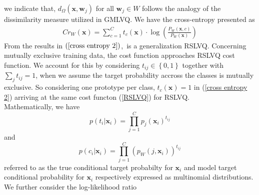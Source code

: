 we indicate that,\hspace{2pt} $d_{\Omega}\left( \mathbf{x},\mathbf{w}_{j}\right)$\hspace{2pt} for all\hspace{2pt} $\mathbf{w}_{j}\in W$\hspace{2pt} follows the analogy of the dissimilarity measure utilized in GMLVQ.
We have the cross-entropy presented as
\begin{align}\label{cross entropy 2}
	Cr_{W}\left( \mathbf{x}\right) =\sum_{c=1}^{C}t_{c}\left( \mathbf{x}\right) \cdot\log\left( \frac{P_{W}\left( \mathbf{x},c\right) }{P_{W}\left( \mathbf{x}\right) } \right) 
\end{align}
From the results in $\left(\ref{cross entropy 2}\right) $,\ is a generalization RSLVQ\cite{villmann2018probabilistic}.
Concerning mutually exclusive training data, the cost function approaches RSLVQ cost function\cite{villmann2018probabilistic}. We account for this by considering\hspace{2pt} $t_{ij}\in\left\lbrace 0,1\right\rbrace  $\hspace{2pt} together with \hspace{2pt}$\sum_{j}t_{ij}=1$, \hspace{2pt}when we assume the target probability accross the classes is mutually exclusive. So considering one prototype per class,\hspace{2pt} $t_{c}\left( \mathbf{x}\right) = 1$\hspace{2pt} in (\ref{cross entropy 2}) arriving at the same cost functon (\ref{RSLVQ}) for RSLVQ.\\ Mathematically, we have
\begin{equation*}
	p\left( t_{i}| \mathbf{x}_{i} \right) = \prod_{j=1}^{C}p_{j}\left( \mathbf{x}_{i}\right) ^{t_{ij}}
\end{equation*}
and 
\begin{equation*}
	p\left( c_{i}| \mathbf{x}_{i} \right) = \prod_{j=1}^{C}\left( p_{W}\left( j,\mathbf{x}_{i}\right)\right) ^{t_{ij}}
\end{equation*}
referred to as the true conditional target probabilty for\hspace{2pt} $\mathbf{x}_{i}$\hspace{2pt} and model target conditional probability for \hspace{2pt}$\mathbf{x}_{i}$ \hspace{2pt}respectively expressed as multinomial distributions\cite{villmann2018probabilistic}. We further consider the log-likelihood ratio
